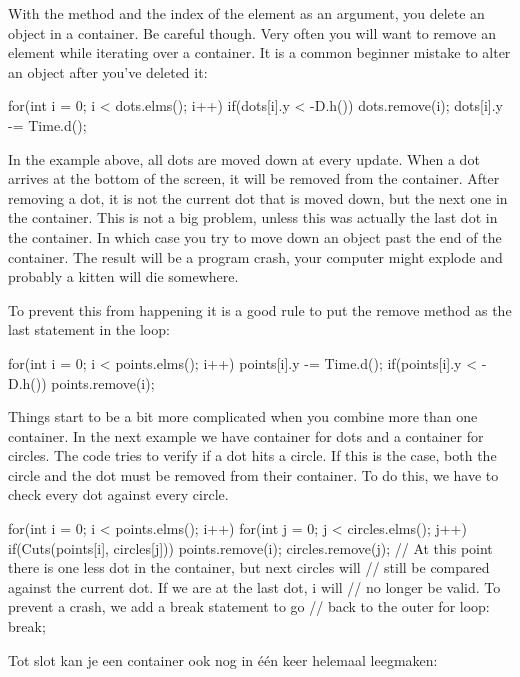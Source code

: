 With the method  and the index of the element as an argument, you delete an object in a container. Be careful though. Very often you will want to remove an element while iterating over a container. It is a common beginner mistake to alter an object after you've deleted it:

\begin{code}
for(int i = 0; i < dots.elms(); i++) {
    if(dots[i].y < -D.h()) {
        dots.remove(i);
	}
	dots[i].y -= Time.d();
}
\end{code}

In the example above, all dots are moved down at every update. When a dot arrives at the bottom of the screen, it will be removed from the container. After removing a dot, it is not the current dot that is moved down, but the next one in the container. This is not a big problem, unless this was actually the last dot in the container. In which case you try to move down an object past the end of the container. The result will be a program crash, your computer might explode and probably a kitten will die somewhere.

To prevent this from happening it is a good rule to put the remove method as the last statement in the loop:

\begin{code}
for(int i = 0; i < points.elms(); i++) {
	points[i].y -= Time.d();
  if(points[i].y < -D.h()) points.remove(i);
}
\end{code}

Things start to be a bit more complicated when you combine more than one container. In the next example we have container for dots and a container for circles. The code tries to verify if a dot hits a circle. If this is the case, both the circle and the dot must be removed from their container. To do this, we have to check every dot against every circle.

\begin{code}
for(int i = 0; i < points.elms(); i++) {
	for(int j = 0; j < circles.elms(); j++) {
	    if(Cuts(points[i], circles[j])) {
		    points.remove(i);
		    circles.remove(j);
		    // At this point there is one less dot in the container, but next circles will
		    // still be compared against the current dot. If we are at the last dot, i will
		    // no longer be valid. To prevent a crash, we add a break statement to go
		    // back to the outer for loop:
			break;
		}		
	}
}
\end{code}


Tot slot kan je een container ook nog in \'e\'en keer helemaal leegmaken:

